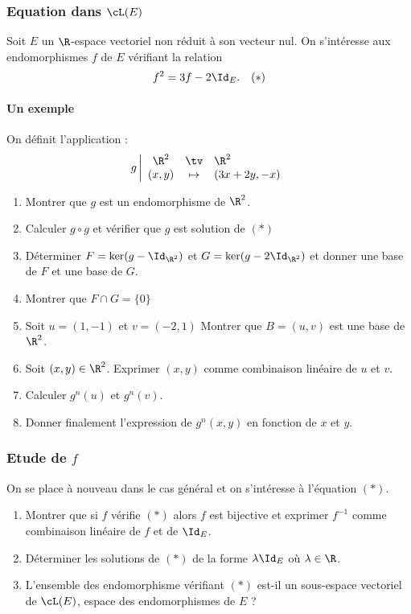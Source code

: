 


\subsubsection{Equation dans $\cL(E)$ }

Soit $E$ un  $\R$-espace vectoriel non réduit à son vecteur nul. On s'intéresse aux endomorphismes $f$ de $E$ vérifiant la relation 
$$f^2 =3f - 2\Id_E.\quad (*) $$
\paragraph{Un exemple}



On définit l'application : 
$$g \left| \begin{array}{ccl}
\R^2 &\tv& \R^2 \\
(x,y) &\mapsto & (3x+2y, -x)
\end{array}\right.$$
\begin{enumerate}
\item Montrer que $g$ est un endomorphisme de $\R^2$.
\item Calculer $g\circ g$ et vérifier que $g$ est solution de $(*)$
\item Déterminer $F =\ker(g-\Id_{\R^2}) $ et $G =\ker(g- 2\Id_{\R^2}) $ et donner une base de $F$ et une base de $G$. 
\item Montrer que $F \cap G= \{ 0\}$ 
\item Soit $u =(1,-1) $ et  $v= (-2 , 1) $ Montrer que $B=(u,v) $ est une base de $\R^2$.
\item Soit $(x,y)\in \R^2$. Exprimer $(x,y) $ comme combinaison linéaire de $u$ et $v$.
\item Calculer $g^n(u)$ et $g^n(v)$. 
\item Donner finalement  l'expression de $g^n(x,y) $ en fonction de $x$ et $y$. 

\end{enumerate}
\subsubsection{Etude de $f$}
On se place à nouveau dans le cas général et on s'intéresse à l'équation $(*)$.
\begin{enumerate}
\item Montrer que si $f$ vérifie $(*)$ alors $f$ est bijective et exprimer $f^{-1}$ comme combinaison linéaire de $f$ et de $ \Id_E$. 
\item Déterminer les solutions de $(*)$ de la forme $\lambda \Id_E$ où $\lambda \in \R$. 
\item L'ensemble des endomorphisme vérifiant $(*)$ est-il un sous-espace vectoriel de $\cL(E)$, espace des endomorphismes de $E$ ? 
\end{enumerate}


